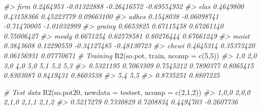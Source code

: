 \documentclass[
]{article}
\newenvironment{Shaded}{\begin{snugshade}}{\end{snugshade}}
\newcommand{\AttributeTok}[1]{\textcolor[rgb]{0.77,0.63,0.00}{#1}}
\newcommand{\CommentTok}[1]{\textcolor[rgb]{0.56,0.35,0.01}{\textit{#1}}}
\newcommand{\DecValTok}[1]{\textcolor[rgb]{0.00,0.00,0.81}{#1}}
\newcommand{\FunctionTok}[1]{\textcolor[rgb]{0.00,0.00,0.00}{#1}}
\newcommand{\NormalTok}[1]{#1}
\newcommand{\StringTok}[1]{\textcolor[rgb]{0.31,0.60,0.02}{#1}}
\begin{document}
\begin{Shaded}
\begin{Highlighting}[]
\CommentTok{\#\textgreater{} firm    0.2464953 {-}0.01322888 {-}0.26416572 {-}0.69554952}
\CommentTok{\#\textgreater{} elas    0.4649800  0.43158366  0.45223779  0.09663100}
\CommentTok{\#\textgreater{} adhes   0.1548038 {-}0.06098741 {-}0.71470005 {-}1.01032999}
\CommentTok{\#\textgreater{} grainy  0.6653825  0.67115458  0.67261140  0.75006427}
\CommentTok{\#\textgreater{} mealy   0.6671254  0.62578581  0.60276444  0.67661249}
\CommentTok{\#\textgreater{} moist   0.3843608  0.12290559 {-}0.34127485 {-}0.48130723}
\CommentTok{\#\textgreater{} chewi   0.4645314  0.35373420  0.06156931  0.07770671}
\CommentTok{\# Training}
\FunctionTok{R2}\NormalTok{(so.pot, }\StringTok{\textquotesingle{}train\textquotesingle{}}\NormalTok{, }\AttributeTok{ncomp =} \FunctionTok{c}\NormalTok{(}\DecValTok{5}\NormalTok{,}\DecValTok{5}\NormalTok{))}
\CommentTok{\#\textgreater{}       1,0       2,0       3,0       4,0       5,0       5,1       5,2       5,3 }
\CommentTok{\#\textgreater{} 0.5321195 0.7063309 0.7545212 0.7890377 0.8065415 0.8303087 0.8419431 0.8603538 }
\CommentTok{\#\textgreater{}       5,4       5,5 }
\CommentTok{\#\textgreater{} 0.8735251 0.8807225}

\CommentTok{\# Test data}
\FunctionTok{R2}\NormalTok{(so.pot20, }\AttributeTok{newdata =}\NormalTok{ testset, }\AttributeTok{ncomp =} \FunctionTok{c}\NormalTok{(}\DecValTok{2}\NormalTok{,}\DecValTok{1}\NormalTok{,}\DecValTok{2}\NormalTok{))}
\CommentTok{\#\textgreater{}      1,0,0      2,0,0      2,1,0      2,1,1      2,1,2 }
\CommentTok{\#\textgreater{}  0.5217279  0.7330829  0.7208834  0.4494703 {-}0.2607736}
\end{Highlighting}
\end{Shaded}
\end{document}
